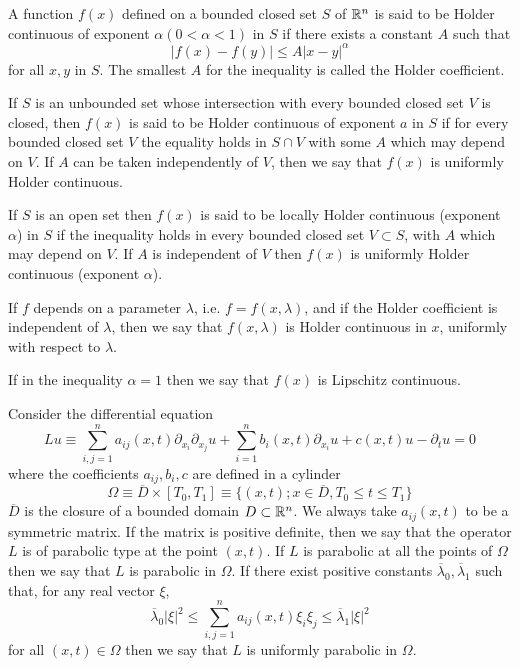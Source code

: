 \begin{definition}
    
A function $f(x)$ defined on a bounded    closed set $S$ of $\mathbb{R}^n$ is said to be Holder continuous of exponent $\alpha(0 < \alpha < 1)$ in $S$ if there exists a constant $A$ such that \[|f(x)-f(y)| \leq A|x-y|^{\alpha}\] for all $x, y$ in $S$. The smallest $A$ for the inequality is called the Holder coefficient.\par

If $S$ is an unbounded set whose intersection with every bounded closed set $V$ is closed, then $f(x)$ is said to be Holder continuous of exponent $a$ in $S$ if for every bounded closed set $V$ the equality holds in $S \cap V$ with some $A$ which may depend on $V$. If $A$ can be taken independently of $V$, then we say that $f(x)$ is uniformly  Holder continuous.\par
If $S$ is an open set then $f(x)$ is said to be locally Holder continuous (exponent  $\alpha$) in $S$ if the inequality holds in every bounded closed set $V \subset S$, with
$A$ which may depend on $V$. If $A$ is independent of $V$ then $f(x)$ is uniformly Holder continuous (exponent $\alpha$).\par
If $f$ depends on a parameter $\lambda$, i.e. $f = f(x,\lambda)$, and if the Holder
coefficient is independent of $\lambda$, then we say that $f(x,\lambda)$ is Holder continuous in $x$, uniformly with respect to $\lambda$.\par
If in the inequality $\alpha = 1$ then we say that $f(x)$ is Lipschitz continuous.
\end{definition}

\begin{definition}

Consider the differential equation
\[
    Lu \equiv \sum\limits_{i,j=1}^n a_{ij}(x,t) \partial_{x_i}\partial_{x_j} u + \sum\limits_{i=1}^n b_i(x,t)\partial_{x_i} u + c(x,t)u - \partial_t u =0
\]
where the coefficients $a_{ij}, b_i, c$ are defined in a cylinder
\[
\Omega \equiv \overline{D}\times [T_0,T_1] \equiv \{(x,t);x\in \overline{D}, T_0 \leq t \leq T_1\}
\]
$\overline{D}$ is the closure of a bounded domain $D\subset\mathbb{R}^n$. We always take $a_{ij}(x,t)$ to be a symmetric matrix. If the matrix is positive
definite, then we say that the operator $L$ is of parabolic type at the point $(x, t)$. If $L$ is parabolic at all the points of $\Omega$ then we say that $L$ is parabolic in $\Omega$. If there exist positive constants $\overline{\lambda}_0, \overline{\lambda}_1$ such that, for any real vector $\xi$,
\[\overline{\lambda}_0|\xi|^2 \leq \sum\limits_{i,j=1}^n a_{ij}(x,t)\xi_i\xi_j \leq \overline{\lambda}_1|\xi|^2\]
for all $(x,t) \in \Omega$ then we say that $L$ is uniformly parabolic in $\Omega$.
\end{definition}

